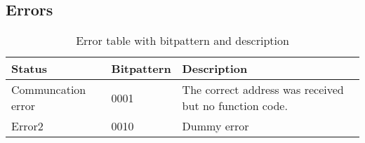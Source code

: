 \subsection{Errors}
\begin{table}[H]
\centering
\begin{tabular}{|l|l|l|}
	\hline
	Status & Bitpattern & Description \\ 
	\hline
	Communcation error 	& 0001  & The correct address was received but no function code. \\
	\hline
	Error2  & 0010  & Dummy error \\
	\hline
\end{tabular}
\caption{Error table with bitpattern and description}
\label{table:errortable}
\end{table}




